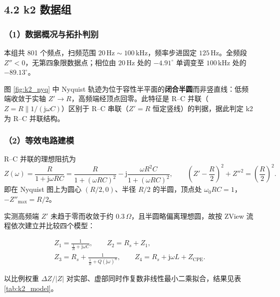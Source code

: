 \documentclass[12pt,a4paper]{ctexart}
\begin{document}
\subsection*{4.2 k2 数据组}

\subsubsection*{（1）数据概况与拓扑判别}
本组共 801 个频点，扫频范围 $20\,\mathrm{Hz}\sim100\,\mathrm{kHz}$，频率步进固定 $125\,\mathrm{Hz}$。全频段 $Z''<0$，无第四象限数据点；相位由 $20\,\mathrm{Hz}$ 处的 $-4.91^\circ$ 单调变至 $100\,\mathrm{kHz}$ 处的 $-89.13^\circ$。

图 \ref{fig:k2_nyq} 中 Nyquist 轨迹为位于容性半平面的\textbf{闭合半圆}而非竖直线：低频端收敛于实轴 $Z'\to R$，高频端经顶点回零。此特征是 R--C 并联（$Z=R\parallel 1/(\mathrm{j}\omega C)$）区别于 R--C 串联（$Z'=R$ 恒定竖线）的判据，据此判定 k2 为 R--C 并联结构。

\subsubsection*{（2）等效电路建模}
R--C 并联的理想阻抗为
\begin{equation}
    Z(\omega)=\frac{R}{1+\mathrm{j}\omega R C}=\frac{R}{1+(\omega R C)^2}-\mathrm{j}\frac{\omega R^2 C}{1+(\omega R C)^2},
    \qquad \left(Z'-\frac{R}{2}\right)^2+Z''^2=\left(\frac{R}{2}\right)^2 .
\end{equation}
即在 Nyquist 图上为圆心 $(R/2,0)$、半径 $R/2$ 的半圆，顶点处 $\omega_0RC=1$，$-Z''_{\max}=R/2$。

实测高频端 $Z'$ 未趋于零而收敛于约 $0.3\,\Omega$，且半圆略偏离理想圆，故按 ZView 流程依次建立并比较四个模型：

\begin{equation}
    \begin{array}{l}
        Z_{1}=\frac{1}{\frac{1}{R}+\mathrm{j}\omega C},\qquad
        Z_{2}=R_s+Z_{1},\\[4pt]
        Z_{3}=R_s+\frac{1}{\frac{1}{R}+Q(\mathrm{j}\omega)^{n}},\qquad
        Z_{4}=R_s+\mathrm{j}\omega L+Z_{\mathrm{CPE}} .
    \end{array}
\end{equation}

以比例权重 $\Delta Z/|Z|$ 对实部、虚部同时作复数非线性最小二乘拟合，结果见表 \ref{tab:k2_model}。
\end{document}
